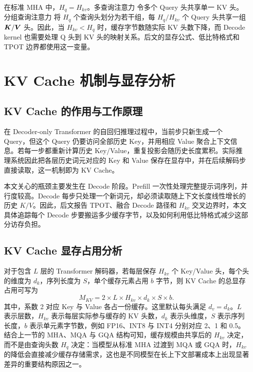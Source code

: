 在标准 MHA 中，$H_q = H_{kv}$。多查询注意力\cite{shazeer2019fast} 令多个 Query 头共享单一 KV 头。分组查询注意力\cite{ainslie2023gqa} 将 $H_q$ 个查询头划分为若干组，每 $H_q/H_{kv}$ 个 Query 头共享一组 $\bm{K}/\bm{V}$ 头。因此，当 $H_{kv} < H_q$ 时，缓存字节数随实际 KV 头数下降，而 Decode kernel 也需要处理 Q 头到 KV 头的映射关系。后文的显存公式、低比特格式和 TPOT 边界都使用这一变量。

\section{KV Cache 机制与显存分析}
\label{sec:ch2-kv-memory}

\subsection{KV Cache 的作用与工作原理}

在 Decoder-only Transformer 的自回归推理过程中，当前步只新生成一个 Query，但这个 Query 仍要访问全部历史 Key，并用相应 Value 聚合上下文信息。若每一步都重新计算历史 Key/Value，重复投影会随历史长度累积。实际推理系统因此把各层历史词元对应的 Key 和 Value 保存在显存中，并在后续解码步直接读取，这一机制即为 KV Cache。

本文关心的瓶颈主要发生在 Decode 阶段。Prefill 一次性处理完整提示词序列，并行度较高。Decode 每步只处理一个新词元，却必须读取随上下文长度线性增长的历史 $K/V$。因此，后文报告 TPOT、融合 Decode 路径和 $H_{kv}$ 交叉边界时，本文具体追踪每个 Decode 步要搬运多少缓存字节，以及如何利用低比特格式减少这部分访存负担。

\subsection{KV Cache 显存占用分析}

对于包含 $L$ 层的 Transformer 解码器，若每层保存 $H_{kv}$ 个 Key/Value 头，每个头的维度为 $d_k$，序列长度为 $S$，单个缓存元素占用 $b$ 字节，则 KV Cache 的总显存占用可写为
\begin{equation}
M_{KV} = 2 \times L \times H_{kv} \times d_k \times S \times b .
  \label{eq:kv_mem}
\end{equation}
其中，系数 2 对应 Key 与 Value 各占一份缓存。这里默认每头满足 $d_v=d_k$。$L$ 表示层数，$H_{kv}$ 表示每层实际参与缓存的 KV 头数，$d_k$ 表示头维度，$S$ 表示序列长度，$b$ 表示单元素字节数，例如 FP16、INT8 与 INT4 分别对应 2、1 和 0.5。结合上一节的 MHA、MQA 与 GQA 结构可知，缓存规模由共享后的 $H_{kv}$ 决定，而不是由查询头数 $H_q$ 决定：当模型从标准 MHA 过渡到 MQA 或 GQA 时，$H_{kv}$ 的降低会直接减少缓存存储需求，这也是不同模型在长上下文部署成本上出现显著差异的重要结构原因之一。

